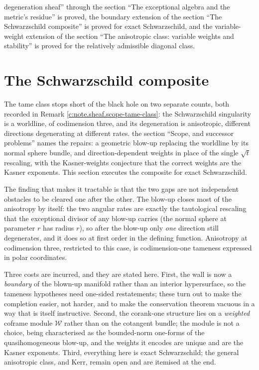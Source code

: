 \documentclass[11pt]{article}
\theoremstyle{definition}
\theoremstyle{plain}
\providecommand{\shW}{}\renewcommand{\shW}{\mathcal{W}}
\begin{document}
degeneration sheaf'' through the section ``The exceptional algebra and the metric's residue'' is proved, the boundary extension of the section ``The Schwarzschild composite'' is proved for exact Schwarzschild, and the variable-weight extension of the section ``The anisotropic class: variable weights and stability'' is proved for the relatively admissible diagonal class.

\section{The Schwarzschild composite}

\label{c:note.sheaf.setting-schwarzschild-composite}
The tame class stops short of the black hole on two separate counts, both recorded in Remark \ref{c:note.sheaf.scope-tame-class}: the Schwarzschild singularity is a worldline, of codimension three, and its degeneration is anisotropic, different directions degenerating at different rates. the section ``Scope, and successor problems'' names the repairs: a geometric blow-up replacing the worldline by its normal sphere bundle, and direction-dependent weights in place of the single $\sqrt t$ rescaling, with the Kasner-weights conjecture that the correct weights are the Kasner exponents. This section executes the composite for exact Schwarzschild.

The finding that makes it tractable is that the two gaps are not independent obstacles to be cleared one after the other. The blow-up closes most of the anisotropy by itself: the two angular rates are exactly the tautological rescaling that the exceptional divisor of any blow-up carries (the normal sphere at parameter $r$ has radius $r$), so after the blow-up only \emph{one} direction still degenerates, and it does so at first order in the defining function. Anisotropy at codimension three, restricted to this case, is codimension-one tameness expressed in polar coordinates.

Three costs are incurred, and they are stated here. First, the wall is now a \emph{boundary} of the blown-up manifold rather than an interior hypersurface, so the tameness hypotheses need one-sided restatements; these turn out to make the completion easier, not harder, and to make the conservation theorem vacuous in a way that is itself instructive. Second, the corank-one structure lies on a \emph{weighted} coframe module $\shW$ rather than on the cotangent bundle; the module is not a choice, being characterised as the bounded-norm one-forms of the quasihomogeneous blow-up, and the weights it encodes are unique and are the Kasner exponents. Third, everything here is exact Schwarzschild; the general anisotropic class, and Kerr, remain open and are itemised at the end.
\end{document}
